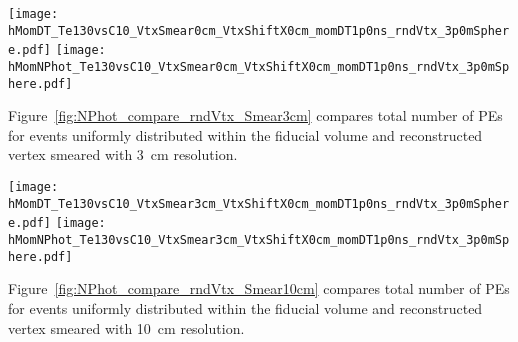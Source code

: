\begin{figure*}[ht]
  \centering
  \texttt{[image: hMomDT\_Te130vsC10\_VtxSmear0cm\_VtxShiftX0cm\_momDT1p0ns\_rndVtx\_3p0mSphere.pdf]}
  \texttt{[image: hMomNPhot\_Te130vsC10\_VtxSmear0cm\_VtxShiftX0cm\_momDT1p0ns\_rndVtx\_3p0mSphere.pdf]}
  \caption{(Left) Difference between measured PE arrival time and arrival time prediction based on 
	vertex location (T$^{predicted} = |r_{hit} - r_{vtx}|/v_{phot}$, where $v_phot = c/1.53$).
        $\vbb$-decay (black solid line) and $\Cten$ events (magenta dashed line) are compared. 
	Vertical line at 1~ns indicates cut for early light selection. 
        (Right) Total number of PEs in the early light sample. 
        $^{10}$C events with energy deposition in the range between 2.1 and 2.9~MeV are
	selected. Verticies are uniformly distributed within the fiducial volume, $R<3$~m.
        {\bf Perfect vertex reconstruction - true vertex position is used.}}
\label{fig:NPhot_compare_rndVtx_noSmear}
\end{figure*}


Figure~\ref{fig:NPhot_compare_rndVtx_Smear3cm} compares total number of PEs for events uniformly
distributed within the fiducial volume and reconstructed vertex smeared with 3~cm resolution.

\begin{figure*}[ht]
  \centering
  \texttt{[image: hMomDT\_Te130vsC10\_VtxSmear3cm\_VtxShiftX0cm\_momDT1p0ns\_rndVtx\_3p0mSphere.pdf]}
  \texttt{[image: hMomNPhot\_Te130vsC10\_VtxSmear3cm\_VtxShiftX0cm\_momDT1p0ns\_rndVtx\_3p0mSphere.pdf]}
  \caption{(Left) Difference between measured PE arrival time and arrival time prediction based on
        vertex location (T$^{predicted} = |r_{hit} - r_{vtx}|/v_{phot}$, where $v_phot = c/1.53$).
        $\vbb$-decay (black solid line) and $\Cten$ events (magenta dashed line) are compared.
        Vertical line at 1~ns indicates cut for early light selection.
        (Right) Total number of PEs in the early light sample.
        $^{10}$C events with energy deposition in the range between 2.1 and 2.9~MeV are
        selected. Verticies are uniformly distributed within the fiducial volume, $R<3$~m.
        {\bf Vetrex is smeared with 3~cm resolution.}}
\label{fig:NPhot_compare_rndVtx_Smear3cm}
\end{figure*}


Figure~\ref{fig:NPhot_compare_rndVtx_Smear10cm} compares total number of PEs for events uniformly
distributed within the fiducial volume and reconstructed vertex smeared with 10~cm resolution.

